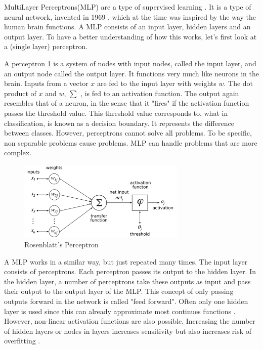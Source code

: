 MultiLayer Perceptrons(MLP) are a type of supervised learning \cite{michie1994machine}. It is a type of neural network, invented in 1969 \cite{minsky1969perceptions}, which at the time  was inspired by the way the human brain functions. A MLP consists of an input layer, hidden layers and an output layer. To have a better understanding of how this works, let's first look at a (single layer) perceptron\cite{rosenblatt1958perceptron}. 

A perceptron \ref{fig:perceptron} is a system of nodes with input nodes, called the input layer, and an output node called the output layer. It functions very much like neurons in the brain. Inputs from a vector $x$ are fed to the input layer with weights $w$. The dot product of $x$ and $w$, $\sum$ ,  is fed to an activation function. The output again resembles that of a neuron, in the sense that it "fires" if the activation function passes the threshold value. This threshold value corresponds to, what in classification, is known as a decision boundary. It represents the difference between classes. However, perceptrons cannot solve all problems. To be specific, non separable problems cause problems. MLP can handle problems that are more complex. \\
\begin{figure}[H]
    \includegraphics[width=80mm]{./img/perceptron.png}
    \caption{\footnotesize{Rosenblatt's Perceptron \cite{wikiPerceptronPNG}}}
    \label{fig:perceptron}
\end{figure}

A MLP works in a similar way, but just repeated many times. The input layer consists of perceptrons. Each perceptron passes its output to the hidden layer. In the hidden layer, a number of perceptrons take these outputs as input and pass their output to the output layer of the MLP. This concept of only passing outputs forward in the network is called "feed forward". Often only one hidden layer is used since this can already approximate most continues functions \cite{cybenko1989approximation}. However, non-linear activation functions are also possible. Increasing the number of hidden layers or nodes in layers increases sensitivity but also increases risk of overfitting \cite{Murtagh1991183}.

